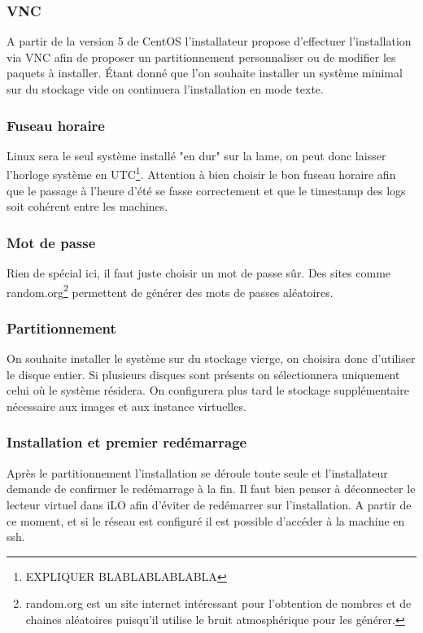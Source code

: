 \documentclass[a4paper,oneside]{report}
\begin{document}
\subsubsection{VNC}
A partir de la version 5 de CentOS l'installateur propose d'effectuer l'installation via VNC afin de proposer un partitionnement personnaliser ou de modifier les paquets à installer.
Étant donné que l'on souhaite installer un système minimal sur du stockage vide on continuera l'installation en mode texte.

\subsubsection{Fuseau horaire}
Linux sera le seul système installé "en dur" sur la lame, on peut donc laisser l'horloge système en UTC\footnote{EXPLIQUER BLABLABLABLABLA}.
Attention à bien choisir le bon fuseau horaire afin que le passage à l'heure d'été se fasse correctement et que le timestamp des logs soit cohérent entre les machines.

\subsubsection{Mot de passe}
Rien de spécial ici, il faut juste choisir un mot de passe sûr. Des sites comme random.org\footnote{random.org est un site internet intéressant pour l'obtention de nombres et de chaines aléatoires puisqu'il utilise le bruit atmosphérique pour les générer.} permettent de générer des mots de passes aléatoires.

\subsubsection{Partitionnement}
On souhaite installer le système sur du stockage vierge, on choisira donc d'utiliser le disque entier.
Si plusieurs disques sont présents on sélectionnera uniquement celui où le système résidera.
On configurera plus tard le stockage supplémentaire nécessaire aux images et aux instance virtuelles.

\subsubsection{Installation et premier redémarrage}
Après le partitionnement l'installation se déroule toute seule et l'installateur demande de confirmer le redémarrage à la fin.
Il faut bien penser à déconnecter le lecteur virtuel dans iLO afin d'éviter de redémarrer sur l'installation.\newline
A partir de ce moment, et si le réseau est configuré il est possible d'accéder à la machine en \gls{ssh}.
\end{document}
